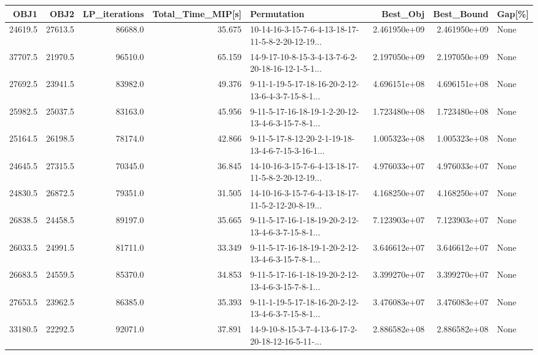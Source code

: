 \begin{tabular}{rrrrlrrl}
\toprule
    OBJ1 &     OBJ2 &  LP\_iterations &  Total\_Time\_MIP[s] &                                        Permutation &      Best\_Obj &    Best\_Bound & Gap[\%] \\
\midrule
 24619.5 &  27613.5 &        86688.0 &             35.675 &  10-14-16-3-15-7-6-4-13-18-17-11-5-8-2-20-12-19... &  2.461950e+09 &  2.461950e+09 &   None \\
 37707.5 &  21970.5 &        96510.0 &             65.159 &  14-9-17-10-8-15-3-4-13-7-6-2-20-18-16-12-1-5-1... &  2.197050e+09 &  2.197050e+09 &   None \\
 27692.5 &  23941.5 &        83982.0 &             49.376 &  9-11-1-19-5-17-18-16-20-2-12-13-6-4-3-7-15-8-1... &  4.696151e+08 &  4.696151e+08 &   None \\
 25982.5 &  25037.5 &        83163.0 &             45.956 &  9-11-5-17-16-18-19-1-2-20-12-13-4-6-3-15-7-8-1... &  1.723480e+08 &  1.723480e+08 &   None \\
 25164.5 &  26198.5 &        78174.0 &             42.866 &  9-11-5-17-8-12-20-2-1-19-18-13-4-6-7-15-3-16-1... &  1.005323e+08 &  1.005323e+08 &   None \\
 24645.5 &  27315.5 &        70345.0 &             36.845 &  14-10-16-3-15-7-6-4-13-18-17-11-5-8-2-20-12-19... &  4.976033e+07 &  4.976033e+07 &   None \\
 24830.5 &  26872.5 &        79351.0 &             31.505 &  14-10-16-3-15-7-6-4-13-18-17-11-5-2-12-20-8-19... &  4.168250e+07 &  4.168250e+07 &   None \\
 26838.5 &  24458.5 &        89197.0 &             35.665 &  9-11-5-17-16-1-18-19-20-2-12-13-4-6-3-7-15-8-1... &  7.123903e+07 &  7.123903e+07 &   None \\
 26033.5 &  24991.5 &        81711.0 &             33.349 &  9-11-5-17-16-18-19-1-20-2-12-13-4-6-3-15-7-8-1... &  3.646612e+07 &  3.646612e+07 &   None \\
 26683.5 &  24559.5 &        85370.0 &             34.853 &  9-11-5-17-16-1-18-19-20-2-12-13-4-6-3-15-7-8-1... &  3.399270e+07 &  3.399270e+07 &   None \\
 27653.5 &  23962.5 &        86385.0 &             35.393 &  9-11-1-19-5-17-18-16-20-2-12-13-4-6-3-7-15-8-1... &  3.476083e+07 &  3.476083e+07 &   None \\
 33180.5 &  22292.5 &        92071.0 &             37.891 &  14-9-10-8-15-3-7-4-13-6-17-2-20-18-12-16-5-11-... &  2.886582e+08 &  2.886582e+08 &   None \\

\end{tabular}
